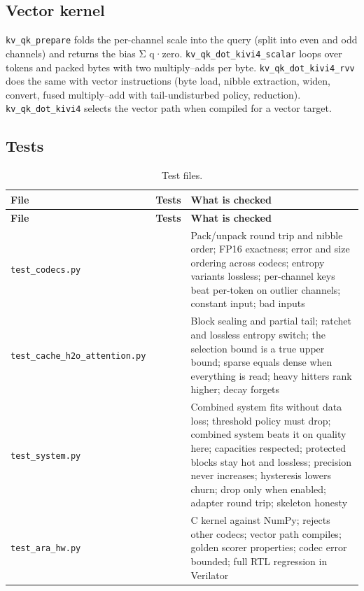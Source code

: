 \documentclass[12pt,a4paper]{report}
\begin{document}
\subsection{Vector kernel}\label{sec:6_5}
\texttt{kv\_\allowbreak{}\allowbreak{}qk\_\allowbreak{}\allowbreak{}prepare} folds the per-channel scale into the query (split into even and odd channels) and returns the bias Σ q·zero. \texttt{kv\_\allowbreak{}\allowbreak{}qk\_\allowbreak{}\allowbreak{}dot\_\allowbreak{}\allowbreak{}kivi4\_\allowbreak{}\allowbreak{}scalar} loops over tokens and packed bytes with two multiply–adds per byte. \texttt{kv\_\allowbreak{}\allowbreak{}qk\_\allowbreak{}\allowbreak{}dot\_\allowbreak{}\allowbreak{}kivi4\_\allowbreak{}\allowbreak{}rvv} does the same with vector instructions (byte load, nibble extraction, widen, convert, fused multiply–add with tail-undisturbed policy, reduction). \texttt{kv\_\allowbreak{}\allowbreak{}qk\_\allowbreak{}\allowbreak{}dot\_\allowbreak{}\allowbreak{}kivi4} selects the vector path when compiled for a vector target.

\subsection{Tests}\label{sec:6_6}
{\fontsize{8}{9.5}\selectfont\setlength{\tabcolsep}{3pt}
\begin{longtable}{>{\raggedright\arraybackslash}p{1.81in}>{\raggedright\arraybackslash}p{0.54in}>{\raggedright\arraybackslash}p{3.62in}}
\caption{Test files.}\\
\toprule
\textbf{File} & \textbf{Tests} & \textbf{What is checked} \\\midrule\endfirsthead
\toprule \textbf{File} & \textbf{Tests} & \textbf{What is checked} \\\midrule\endhead
\bottomrule\endfoot
\texttt{test\_\allowbreak{}\allowbreak{}codecs.\allowbreak{}py} & 10 & Pack/unpack round trip and nibble order; FP16 exactness; error and size ordering across codecs; entropy variants lossless; per-channel keys beat per-token on outlier channels; constant input; bad inputs \\
\texttt{test\_\allowbreak{}\allowbreak{}cache\_\allowbreak{}\allowbreak{}h2o\_\allowbreak{}\allowbreak{}attention.\allowbreak{}py} & 8 & Block sealing and partial tail; ratchet and lossless entropy switch; the selection bound is a true upper bound; sparse equals dense when everything is read; heavy hitters rank higher; decay forgets \\
\texttt{test\_\allowbreak{}\allowbreak{}system.\allowbreak{}py} & 12 & Combined system fits without data loss; threshold policy must drop; combined system beats it on quality here; capacities respected; protected blocks stay hot and lossless; precision never increases; hysteresis lowers churn; drop only when enabled; adapter round trip; skeleton honesty \\
\texttt{test\_\allowbreak{}\allowbreak{}ara\_\allowbreak{}\allowbreak{}hw.\allowbreak{}py} & 6 & C kernel against NumPy; rejects other codecs; vector path compiles; golden scorer properties; codec error bounded; full RTL regression in Verilator \\
\bottomrule
\end{longtable}}
\end{document}
